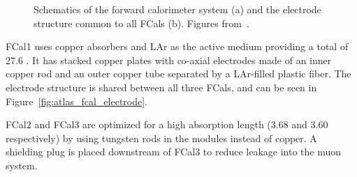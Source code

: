 \begin{figure}[htp]
    \centering
    \hfill
    \caption{Schematics of the forward calorimeter system (a) and the electrode structure common to all FCals (b). Figures from~\cite{atlas_collaboration_paper}.}\label{fig:atlas_fcal_combined}
\end{figure}

FCal1 uses copper absorbers and LAr as the active medium providing a total of 27.6 \radlength{}. It has stacked copper plates with co-axial electrodes made of an inner copper rod and an outer copper tube separated by a LAr-filled plastic fiber. The electrode structure is shared between all three FCals, and can be seen in Figure~\ref{fig:atlas_fcal_electrode}. 

FCal2 and FCal3 are optimized for a high absorption length (3.68 \intlength{} and 3.60 \intlength{} respectively) by using tungsten rods in the modules instead of copper. A shielding plug is placed downstream of FCal3 to reduce leakage into the muon system.
